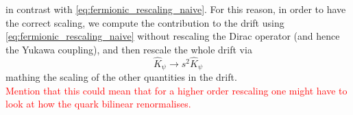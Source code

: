 in contrast with \eqref{eq:fermionic_rescaling_naive}. For this reason, in order to have the correct scaling, we compute the contribution to the drift using \eqref{eq:fermionic_rescaling_naive} without rescaling the Dirac operator (and hence the Yukawa coupling), and then rescale the whole drift via 
\begin{equation*}
    \widehat{K}_\psi \to s^2 \widehat{K}_\psi
\end{equation*}
mathing the scaling of the other quantities in the drift. \\
\textcolor{red}{Mention that this could mean that for a higher order rescaling one might have to look at how the quark bilinear renormalises.}

\newpage 